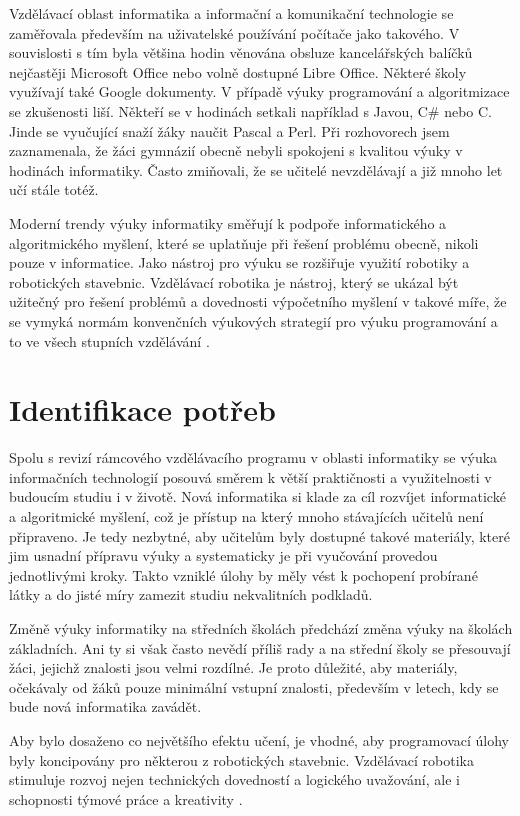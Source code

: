 \documentclass[
  digital,     %
  oneside,     %
  nosansbold,  %
  colorbold, %
  lof,         %
  nolot,         %
]{fithesis4}
\begin{document}
Vzdělávací oblast informatika a informační a komunikační technologie se zaměřovala především na uživatelské používání počítače jako takového. V souvislosti s tím byla většina hodin věnována obsluze kancelářských balíčků nejčastěji Microsoft Office nebo volně dostupné Libre Office. Některé školy využívají také Google dokumenty. V případě výuky programování a algoritmizace se zkušenosti liší. Někteří se v hodinách setkali například s Javou, C\# nebo C. Jinde se vyučující snaží žáky naučit Pascal a Perl. Při rozhovorech jsem zaznamenala, že  žáci gymnázií obecně nebyli spokojeni s kvalitou výuky v hodinách informatiky. Často zmiňovali, že se učitelé nevzdělávají a již mnoho let učí stále totéž.

Moderní trendy výuky informatiky směřují k podpoře informatického a algoritmického myšlení, které se uplatňuje při řešení problému obecně, nikoli pouze v informatice. Jako nástroj pro výuku se rozšiřuje využití robotiky a robotických stavebnic. Vzdělávací robotika je nástroj, který se ukázal být užitečný pro řešení problémů a dovednosti výpočetního myšlení v takové míře, že se vymyká normám konvenčních výukových strategií pro výuku programování a to ve všech stupních vzdělávání \cite{Noor20}. 

\section{Identifikace potřeb}
Spolu s revizí rámcového vzdělávacího programu v oblasti informatiky se výuka informačních technologií posouvá směrem k větší praktičnosti a využitelnosti v budoucím studiu i v životě. Nová informatika si klade za cíl rozvíjet informatické a algoritmické myšlení, což je přístup na který mnoho stávajících učitelů není připraveno. Je tedy nezbytné, aby učitelům byly dostupné takové materiály, které jim usnadní přípravu výuky a systematicky je při vyučování provedou jednotlivými kroky. Takto vzniklé úlohy by měly vést k pochopení probírané látky a do jisté míry zamezit studiu nekvalitních podkladů.

Změně výuky informatiky na středních školách předchází změna výuky na školách základních. Ani ty si však často nevědí příliš rady a na střední školy se přesouvají žáci, jejichž znalosti jsou velmi rozdílné. Je proto důležité, aby materiály,  očekávaly od žáků pouze minimální vstupní znalosti, především v letech, kdy se bude nová informatika zavádět.

Aby bylo dosaženo co největšího efektu učení, je vhodné, aby programovací úlohy byly koncipovány pro některou z robotických stavebnic. Vzdělávací robotika stimuluje rozvoj nejen technických dovedností a logického uvažování, ale i schopnosti týmové práce a kreativity \cite{Souza18}. 
\end{document}
